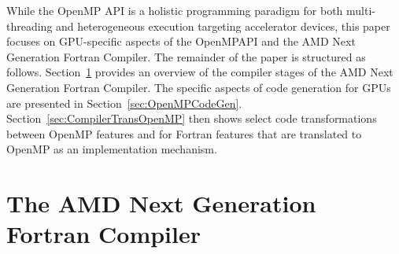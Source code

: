\documentclass[acmtog,natbib=false]{acmart}
\newcommand{\todo}[1]{\textcolor{red}{#1}}
\begin{document}
While the OpenMP \ac{API} is a holistic programming paradigm for both multi-threading and heterogeneous execution targeting accelerator devices, this paper focuses on \acs{GPU}-specific aspects of the OpenMP\ac{API} and the AMD Next Generation Fortran Compiler.
The remainder of the paper is structured as follows.
Section~\ref{sec:LLVMFlangCompiler} provides an overview of the compiler stages of the AMD Next Generation Fortran Compiler.
The specific aspects of code generation for \acp{GPU} are presented in Section~\ref{sec:OpenMPCodeGen}.
Section~\ref{sec:CompilerTransOpenMP} then shows select code transformations between OpenMP features and for Fortran features that are translated to OpenMP as an implementation mechanism.



\section{The AMD Next Generation Fortran Compiler}
\label{sec:LLVMFlangCompiler}
\end{document}
